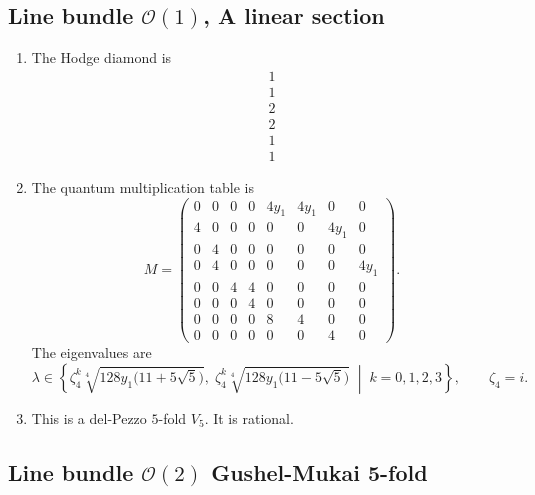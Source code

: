 \documentclass[11pt]{amsart}
\newcounter{num}[section] %
\begin{document}
\subsection{Line bundle $\mathcal{O}(1)$, A linear section}
\begin{enumerate}

\item[1)]The Hodge diamond is 
\[
    \begin{array}{c}
         1  \\
          1\\
          2\\
          2\\
          1\\
          1
    \end{array}
\]

\item[2)]  The quantum multiplication table is
\[
M=
\begin{pmatrix}
0&0&0&0&4y_1&4y_1&0&0\\
4&0&0&0&0&0&4y_1&0\\
0&4&0&0&0&0&0&0\\
0&4&0&0&0&0&0&4y_1\\
0&0&4&4&0&0&0&0\\
0&0&0&4&0&0&0&0\\
0&0&0&0&8&4&0&0\\
0&0&0&0&0&0&4&0
\end{pmatrix}.
\]
The eigenvalues are
\[
\lambda \in 
\left\{
\zeta_4^k\sqrt[4]{128y_1\bigl(11+5\sqrt5\bigr)},
\;
\zeta_4^k\sqrt[4]{128y_1\bigl(11-5\sqrt5\bigr)}
\;\middle|\;
k=0,1,2,3
\right\},
\qquad \zeta_4=i.
\]
\item[3)] This is a del-Pezzo $5$-fold $V_5$. It is rational. 
\end{enumerate}
\subsection{Line bundle $\mathcal{O}(2)$ Gushel-Mukai 5-fold}
\end{document}
